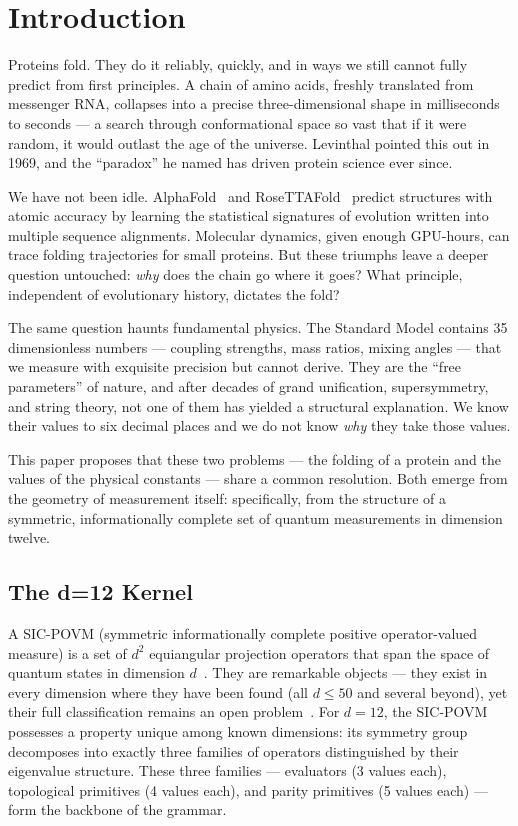\documentclass[11pt,a4paper,twocolumn]{article}
\begin{document}
\section{Introduction}

Proteins fold. They do it reliably, quickly, and in ways we still cannot fully predict from first principles. A chain of amino acids, freshly translated from messenger RNA, collapses into a precise three-dimensional shape in milliseconds to seconds — a search through conformational space so vast that if it were random, it would outlast the age of the universe. Levinthal pointed this out in 1969, and the ``paradox'' he named has driven protein science ever since.

We have not been idle. AlphaFold~\cite{jumper2021alphafold} and RoseTTAFold~\cite{baek2021rosettafold} predict structures with atomic accuracy by learning the statistical signatures of evolution written into multiple sequence alignments. Molecular dynamics, given enough GPU-hours, can trace folding trajectories for small proteins. But these triumphs leave a deeper question untouched: \emph{why} does the chain go where it goes? What principle, independent of evolutionary history, dictates the fold?

The same question haunts fundamental physics. The Standard Model contains 35 dimensionless numbers — coupling strengths, mass ratios, mixing angles — that we measure with exquisite precision but cannot derive. They are the ``free parameters'' of nature, and after decades of grand unification, supersymmetry, and string theory, not one of them has yielded a structural explanation. We know their values to six decimal places and we do not know \emph{why} they take those values.

This paper proposes that these two problems — the folding of a protein and the values of the physical constants — share a common resolution. Both emerge from the geometry of measurement itself: specifically, from the structure of a symmetric, informationally complete set of quantum measurements in dimension twelve.

\subsection{The d=12 Kernel}

A SIC-POVM (symmetric informationally complete positive operator-valued measure) is a set of $d^2$ equiangular projection operators that span the space of quantum states in dimension $d$~\cite{renes2004sic,appleby2005sic}. They are remarkable objects — they exist in every dimension where they have been found (all $d \leq 50$ and several beyond), yet their full classification remains an open problem~\cite{fuchs2017sic}. For $d=12$, the SIC-POVM possesses a property unique among known dimensions: its symmetry group decomposes into exactly three families of operators distinguished by their eigenvalue structure. These three families — evaluators (3 values each), topological primitives (4 values each), and parity primitives (5 values each) — form the backbone of the grammar.
\end{document}
